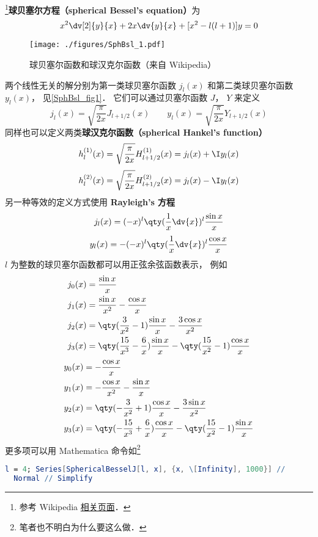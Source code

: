 

\footnote{参考 Wikipedia \href{https://en.wikipedia.org/wiki/Bessel_function}{相关页面}．}\textbf{球贝塞尔方程（spherical Bessel's equation）}为
\begin{equation}
x^2 \dv[2]{y}{x} + 2x \dv{y}{x} + [x^2 - l(l + 1)]y = 0
\end{equation}
\begin{figure}[ht]
\centering
\texttt{[image: ./figures/SphBsl\_1.pdf]}
\caption{球贝塞尔函数和球汉克尔函数（来自 Wikipedia）} \label{SphBsl_fig1}
\end{figure}
两个线性无关的解分别为第一类球贝塞尔函数 $j_l(x)$ 和第二类球贝塞尔函数 $y_l(x)$， 见\autoref{SphBsl_fig1}． 它们可以通过贝塞尔函数 $J$， $Y$ 来定义
\begin{equation}
j_l(x) = \sqrt{\frac{\pi}{2x}} J_{l+1/2}(x)
\qquad
y_l(x) = \sqrt{\frac{\pi}{2x}} Y_{l+1/2}(x)
\end{equation}
同样也可以定义两类\textbf{球汉克尔函数（spherical Hankel's function）}
\begin{equation}
h_l^{(1)}(x) = \sqrt {\frac{\pi }{2x}} H_{l+1/2}^{(1)}(x) = j_l(x) + \I y_l(x)
\end{equation}
\begin{equation}
h_l^{(2)}(x) = \sqrt{\frac{\pi }{2x}} H_{l+1/2}^{(2)}(x) = j_l(x) - \I y_l(x)
\end{equation}
另一种等效的定义方式使用 \textbf{Rayleigh's 方程}
\begin{equation}
j_l(x) = (-x)^l \qty(\frac{1}{x} \dv{x})^l \frac{\sin x}{x}
\end{equation}
\begin{equation}
y_l(x) = -(-x)^l \qty(\frac{1}{x} \dv{x})^l \frac{\cos x}{x}
\end{equation}
$l$ 为整数的球贝塞尔函数都可以用正弦余弦函数表示， 例如
\begin{align}
&j_0(x) = \frac{\sin x}{x}\\
&j_1(x) = \frac{\sin x}{x^2} - \frac{\cos x}{x}\\
&j_2(x) = \qty(\frac{3}{x^2} - 1) \frac{\sin x}{x} - \frac{3\cos x}{x^2}\\
&j_3(x) = \qty(\frac{15}{x^3} - \frac{6}{x})\frac{\sin x}{x} - \qty(\frac{15}{x^2}-1)\frac{\cos x}{x}
\end{align}
\begin{align}
&y_0(x) = -\frac{\cos x}{x}\\
&y_1(x) = -\frac{\cos x}{x^2} - \frac{\sin x}{x}\\
&y_2(x) = \qty(-\frac{3}{x^2}+1)\frac{\cos x}{x} - \frac{3\sin x}{x^2}\\
&y_3(x) = \qty(-\frac{15}{x^3}+\frac{6}{x}) \frac{\cos x}{x} - \qty(\frac{15}{x^2} - 1)\frac{\sin x}{x}
\end{align}
更多项可以用 Mathematica 命令如\footnote{笔者也不明白为什么要这么做．}
\begin{lstlisting}[language=Mathematica]
l = 4; Series[SphericalBesselJ[l, x], {x, \[Infinity], 1000}] // 
  Normal // Simplify
\end{lstlisting}

